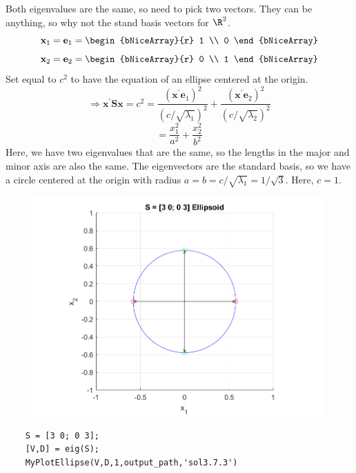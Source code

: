 Both eigenvalues are the same, so need to pick two vectors. They can be anything, so why not the stand basis vectors for $\R^2$.
\[
    \textbf{x}_1
    =
    \textbf{e}_1
    =
    \begin{bNiceArray}{r}
        1 \\
        0
    \end{bNiceArray}
\]
\[
    \textbf{x}_2
    =
    \textbf{e}_2
    =
    \begin{bNiceArray}{r}
        0 \\
        1
    \end{bNiceArray}
\]
Set equal to $c^2$ to have the equation of an ellipse centered at the origin.
\[
    \Rightarrow
    \textbf{x}^{\prime}
    \textbf{S}
    \textbf{x}
    =
    c^2
    =
    \frac{{(\textbf{x}^{\prime}\textbf{e}_1)}^{2}}{{(c/\sqrt{\lambda_1})}^{2}}
    +
    \frac{{(\textbf{x}^{\prime}\textbf{e}_2)}^{2}}{{(c/\sqrt{\lambda_2})}^{2}}
\]
\[
    =
    \frac{{x}_{1}^{2}}{{a}^{2}}
    +
    \frac{{x}_{2}^{2}}{{b}^{2}}
\]
Here, we have two eigenvalues that are the same, so the lengths in the major and minor axis are also the same. The eigenvectors are the standard basis, so we have a circle centered at the origin with radius $a = b = c/\sqrt{\lambda_1} = 1/\sqrt{3}$. Here, $c = 1$.
\begin{figure}[H]
    \centering
    \includegraphics[scale=0.75]{./matlab/chapter-3/sol3.7.3.png}
\end{figure}
\begin{lstlisting}
    S = [3 0; 0 3];
    [V,D] = eig(S);
    MyPlotEllipse(V,D,1,output_path,'sol3.7.3')
\end{lstlisting}